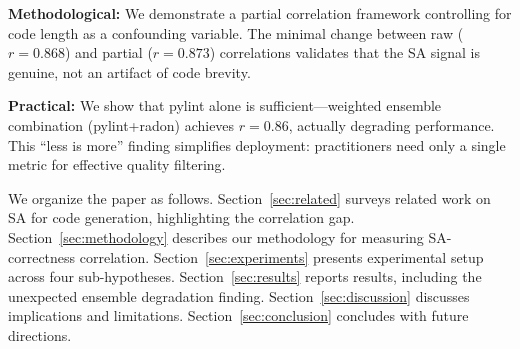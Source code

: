 \textbf{Methodological:} We demonstrate a partial correlation framework controlling for code length as a confounding variable. The minimal change between raw ($r=0.868$) and partial ($r=0.873$) correlations validates that the SA signal is genuine, not an artifact of code brevity.

\textbf{Practical:} We show that pylint alone is sufficient---weighted ensemble combination (pylint+radon) achieves $r=0.86$, actually degrading performance. This ``less is more'' finding simplifies deployment: practitioners need only a single metric for effective quality filtering.

We organize the paper as follows. Section~\ref{sec:related} surveys related work on SA for code generation, highlighting the correlation gap. Section~\ref{sec:methodology} describes our methodology for measuring SA-correctness correlation. Section~\ref{sec:experiments} presents experimental setup across four sub-hypotheses. Section~\ref{sec:results} reports results, including the unexpected ensemble degradation finding. Section~\ref{sec:discussion} discusses implications and limitations. Section~\ref{sec:conclusion} concludes with future directions.
